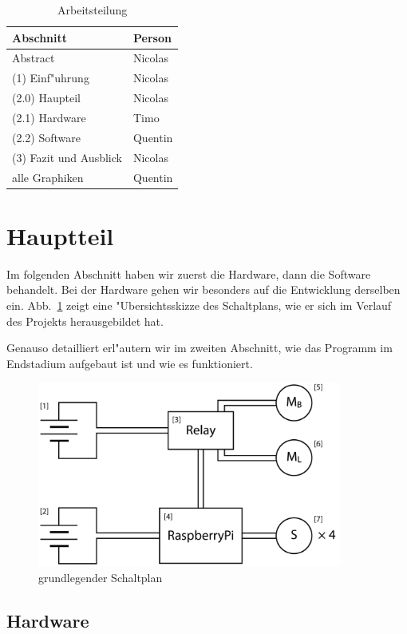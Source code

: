 \documentclass[a4paper,12pt]{article}
\begin{document}
\begin{table}[h]
	\centering
	\begin{tabular}{|l|l|}
	\hline
		Abschnitt & Person \\ \hline
		Abstract & Nicolas \\
		(1) Einf"uhrung & Nicolas \\
		(2.0) Haupteil & Nicolas \\
		(2.1) Hardware & Timo \\
		(2.2) Software & Quentin \\
		(3) Fazit und Ausblick & Nicolas \\
		alle Graphiken & Quentin \\
	\hline
	\end{tabular}
	\caption{Arbeitsteilung}
	\label{Tab1}
\end{table}

\section{Hauptteil}\label{sec2}

Im folgenden Abschnitt haben wir zuerst die Hardware, dann die Software behandelt.
Bei der Hardware gehen wir besonders auf die Entwicklung derselben ein.
Abb.~\ref{Fig2} zeigt eine "Ubersichtsskizze des Schaltplans, wie er sich im Verlauf des Projekts herausgebildet hat.

Genauso detailliert erl"autern wir im zweiten Abschnitt, wie das Programm im Endstadium aufgebaut ist und wie es funktioniert.

\begin{figure}[h]
	\centering
	\includegraphics[width=10cm]{./media/circuit_general.png}
	\caption{grundlegender Schaltplan}
	\label{Fig2}
\end{figure}

\subsection{Hardware}\label{sec2.1}
\end{document}
